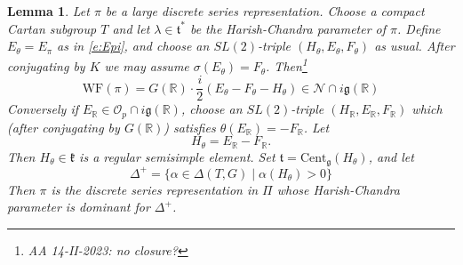 \documentclass[10pt,leqno]{article}
\newtheorem{lemma}[equation]{Lemma}
\newcommand{\Cent}{\mathrm{Cent}}
\renewcommand{\O}{\mathcal O}
\newcommand{\R}{\mathbb R}
\newcommand{\N}{\mathcal N}
\renewcommand{\k}{\mathfrak k}
\renewcommand{\t}{\mathfrak t}
\newcommand{\g}{\mathfrak g}
\newcommand{\WF}{\mathrm{WF}}
\newcommand{\Op}{\O_p}
\begin{document}
\begin{lemma}
  Let $\pi$ be a large discrete series representation.
Choose a compact Cartan subgroup $T$ and let $\lambda\in \t^*$ be the Harish-Chandra parameter of $\pi$.
Define $E_\theta=E_\pi$ as in \eqref{e:Epi}, and choose an $SL(2)$-triple $(H_\theta,E_\theta,F_\theta)$ as usual.
After conjugating by $K$ we may assume $\sigma(E_\theta)=F_\theta$.  Then\footnote{AA 14-II-2023: no closure?}
$$
\WF(\pi)=G(\R)\cdot\frac i2(E_\theta-F_\theta-H_\theta)\in\N\cap i\g(\R)
$$
Conversely if $E_\R\in \Op\cap i\g(\R)$, choose an $SL(2)$-triple $(H_\R,E_\R,F_\R)$ which (after conjugating by $G(\R)$) satisfies $\theta(E_\R)=-F_\R$.
Let
$$
H_\theta=E_\R-F_\R.
$$
Then $H_\theta\in\k$ is a regular semisimple element.
Set $\t=\Cent_{\g}(H_\theta)$, and let
$$
\Delta^+=\{\alpha\in\Delta(T,G)\mid  \alpha(H_\theta)>0\}
$$
Then $\pi$ is the discrete series representation in $\Pi$ whose Harish-Chandra parameter is dominant for $\Delta^+$. 
\end{lemma}



\end{document}
